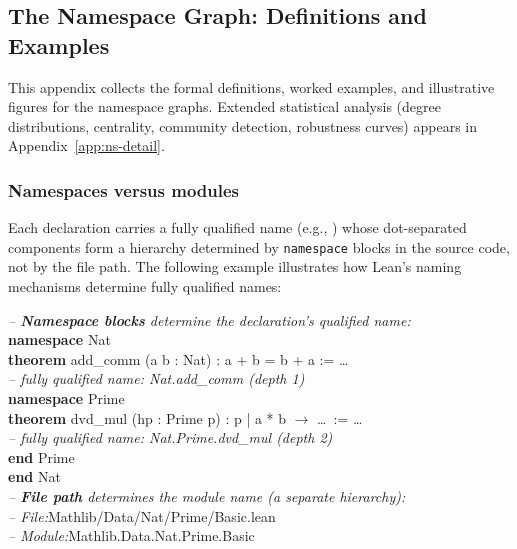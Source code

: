 \subsection{The Namespace Graph: Definitions and Examples}
\label{sec:namespace-graph}

This appendix collects the formal definitions, worked examples, and illustrative figures for the namespace graphs. Extended statistical analysis (degree distributions, centrality, community detection, robustness curves) appears in Appendix~\ref{app:ns-detail}.

\subsubsection{Namespaces versus modules}
Each declaration carries a fully qualified name (e.g., ) whose dot-separated components form a hierarchy determined by \texttt{namespace} blocks in the source code, not by the file path. The following example illustrates how Lean's naming mechanisms determine fully qualified names:

\begin{codebox}
\textit{\color{gray}-- \textbf{Namespace blocks} determine the declaration's qualified name:}\\
\textbf{namespace} \textcolor{green!50!black}{Nat}\\
\hspace{1.5em}\textbf{theorem} \textcolor{red!70!black}{add\_comm} (a b : Nat) : a + b = b + a := \ldots\\
\hspace{1.5em}\textit{\color{gray}-- fully qualified name: \textcolor{red!70!black}{Nat.add\_comm} \quad(depth 1)}\\[3pt]
\hspace{1.5em}\textbf{namespace} \textcolor{green!50!black}{Prime}\\
\hspace{3em}\textbf{theorem} \textcolor{red!70!black}{dvd\_mul} (hp : Prime p) : p | a * b $\to$ \ldots\ := \ldots\\
\hspace{3em}\textit{\color{gray}-- fully qualified name: \textcolor{red!70!black}{Nat.Prime.dvd\_mul} \quad(depth 2)}\\
\hspace{1.5em}\textbf{end} \textcolor{green!50!black}{Prime}\\
\textbf{end} \textcolor{green!50!black}{Nat}\\[6pt]
\textit{\color{gray}-- \textbf{File path} determines the module name (a separate hierarchy):}\\
\textit{\color{gray}-- File:}\quad \textcolor{blue!60!black}{Mathlib/Data/Nat/Prime/Basic.lean}\\
\textit{\color{gray}-- Module:}\quad \textcolor{blue!60!black}{Mathlib.Data.Nat.Prime.Basic}
\end{codebox}

